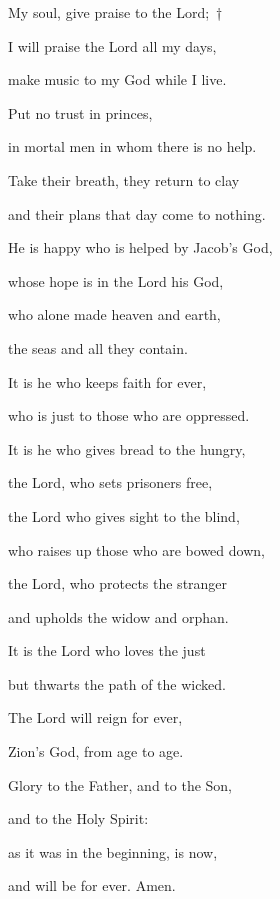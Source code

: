 \noindent My soul, give praise to the Lord;~†~\nopagebreak

I will praise the Lord all my days,~\GreStar{}~\nopagebreak

make music to my God while I live.

\noindent Put no trust in princes,~\GreStar{}~\nopagebreak

in mortal men in whom there is no help.

\noindent Take their breath, they return to clay~\GreStar{}~\nopagebreak

and their plans that day come to nothing.

\noindent He is happy who is helped by Jacob’s God,~\GreStar{}~\nopagebreak

whose hope is in the Lord his God,

\noindent who alone made heaven and earth,~\GreStar{}~\nopagebreak

the seas and all they contain.

\noindent It is he who keeps faith for ever,~\GreStar{}~\nopagebreak

who is just to those who are oppressed.

\noindent It is he who gives bread to the hungry,~\GreStar{}~\nopagebreak

the Lord, who sets prisoners free,

\noindent the Lord who gives sight to the blind,~\GreStar{}~\nopagebreak

who raises up those who are bowed down,

\noindent the Lord, who protects the stranger~\GreStar{}~\nopagebreak

and upholds the widow and orphan.

\noindent It is the Lord who loves the just~\GreStar{}~\nopagebreak

but thwarts the path of the wicked.

\noindent The Lord will reign for ever,~\GreStar{}~\nopagebreak

Zion’s God, from age to age.

\noindent Glory to the Father, and to the Son,~\GreStar{}~\nopagebreak

and to the Holy Spirit:

\noindent as it was in the beginning, is now,~\GreStar{}~\nopagebreak

and will be for ever. Amen.
